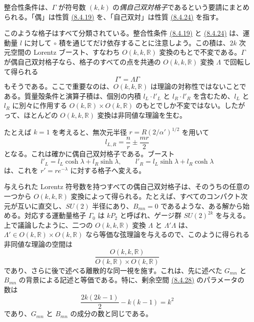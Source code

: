 整合性条件は、$\Gamma$ が符号数 $(k,k)$ の\emph{偶自己双対格子}であるという要請にまとめられる。「偶」は性質 \hyperref[eq:8.4.19]{(8.4.19)} を、「自己双対」は性質 \hyperref[eq:8.4.24]{(8.4.24)} を指す。

このような格子はすべて分類されている。整合性条件 \hyperref[eq:8.4.19]{(8.4.19)} と \hyperref[eq:8.4.24]{(8.4.24)} は、運動量 $l$ に対して $\circ$ 積を通じてだけ依存することに注意しよう。この積は、$2k$ 次元空間の Lorentz ブースト、すなわち $O(k,k,\mathbb R)$ 変換のもとで不変である。$\Gamma$ が偶自己双対格子なら、格子のすべての点を共通の $O(k,k,\mathbb R)$ 変換 $\Lambda$ で回転して得られる
\begin{equation}
\Gamma'=\Lambda\Gamma
\tag{8.4.25}\label{eq:8.4.25}
\end{equation}
もそうである。ここで重要なのは、$O(k,k,\mathbb R)$ は理論の対称性ではないことである。質量殻条件と演算子積は、個別の内積 $l_L\cdot l'_L$ と $l_R\cdot l'_R$ を含むため、$l_L$ と $l_R$ に別々に作用する $O(k,\mathbb R)\times O(k,\mathbb R)$ のもとでしか不変ではない。したがって、ほとんどの $O(k,k,\mathbb R)$ 変換は非同値な理論を生む。

たとえば $k=1$ を考えると、無次元半径 $r=R(2/\alpha')^{1/2}$ を用いて
\begin{equation}
l_{L,R}=\frac nr\pm\frac{mr}2
\tag{8.4.26}\label{eq:8.4.26}
\end{equation}
となる。これは確かに偶自己双対格子である。ブースト
\begin{equation}
l'_L=l_L\cosh\lambda+l_R\sinh\lambda,\qquad
l'_R=l_L\sinh\lambda+l_R\cosh\lambda
\tag{8.4.27}\label{eq:8.4.27}
\end{equation}
は、これを $r'=re^{-\lambda}$ に対する格子へ変える。

与えられた Lorentz 符号数を持つすべての偶自己双対格子は、そのうちの任意の一つから $O(k,k,\mathbb R)$ 変換によって得られる。たとえば、すべてのコンパクト次元が互いに直交し、$SU(2)$ 半径にあり、$B_{mn}=0$ であるような、ある解から始める。対応する運動量格子 $\Gamma_0$ は $kP_2$ と呼ばれ、ゲージ群 $SU(2)^{2k}$ を与える。上で議論したように、二つの $O(k,k,\mathbb R)$ 変換 $\Lambda$ と $\Lambda'\Lambda$ は、$\Lambda'\in O(k,\mathbb R)\times O(k,\mathbb R)$ なら等価な弦理論を与えるので、このように得られる非同値な理論の空間は
\begin{equation}
\frac{O(k,k,\mathbb R)}{O(k,\mathbb R)\times O(k,\mathbb R)}
\tag{8.4.28}\label{eq:8.4.28}
\end{equation}
であり、さらに後で述べる離散的な同一視を施す。これは、先に述べた $G_{mn}$ と $B_{mn}$ の背景による記述と等価である。特に、剰余空間 \hyperref[eq:8.4.28]{(8.4.28)} のパラメータの数は
\begin{equation}
\frac{2k(2k-1)}2-k(k-1)=k^2
\tag{8.4.29}\label{eq:8.4.29}
\end{equation}
であり、$G_{mn}$ と $B_{mn}$ の成分の数と同じである。

